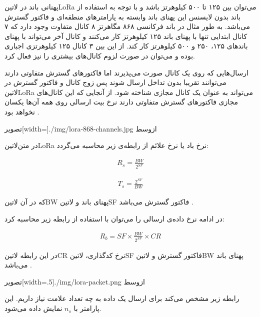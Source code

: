 پهنانی باند در ‌لاتین{LoRa} می‌توان بین ۱۲۵ تا ۵۰۰ کیلوهرتز باشد و با توجه به استفاده از باند بدون لایسنس این پهنای باند وابسته به پارامتر‌های منطقه‌ای و فاکتور گسترش می‌باشد.
به طور مثال در باند فرکانسی ۸۶۸ مگاهرتز ۸ کانال متفاوت وجود دارد که ۷ کانال ابتدایی تنها با پهنای باند ۱۲۵ کیلوهرتز کار می‌کنند و کانال آخر می‌تواند با پهنای باند‌های
۱۲۵، ۲۵۰ و ۵۰۰ کیلوهرتز کار کند. از این بین ۳ کانال ۱۲۵ کیلوهرتزی اجباری بوده و می‌توان در صورت لزوم کانال‌های بیشتری را نیز فعال کرد.

ارسال‌هایی که روی یک کانال صورت می‌پذیرند اما فاکتورهای گسترش متفاوتی دارند می‌توانند تقریبا بدون تداخل ارسال شوند پس زوج کانال و فاکتور گسترش در ‌لاتین{LoRa} می‌تواند به عنوان
یک کانال مجازی شناخته شود. از آنجایی که این کانال‌های مجازی فاکتورهای گسترش متفاوتی دارند نرخ بیت ارسالی روی همه آن‌ها یکسان نخواهد بود
.

‌تصویر[width=\textwidth]{./img/lora-868-channels.jpg}
‌ازوسط

در متن‌لاتین{LoRa} نرخ باد یا نرخ علائم از رابطه‌ی زیر محاسبه می‌گردد:

\begin{align}
  \label{معادله: نرخ باد یا علائم در LoRa}
  R_{s} = \frac{BW}{2^{SF}}
\end{align}

\begin{align}
  \label{معادله: زمان علامت در LoRa}
  T_{s} = \frac{2^{SF}}{BW}
\end{align}

که در آن ‌لاتین{BW} پهنای باند و ‌لاتین{SF} فاکتور گسترش می‌باشد
.

در ادامه نرخ داده‌ی ارسالی را می‌توان با استفاده از رابطه زیر محاسبه کرد:

\begin{align}
  \label{معادله: نرخ داده در LoRa}
  R_{b} = SF \times \frac{BW}{2^{SF}} \times CR
\end{align}

در این رابطه ‌لاتین{CR} نرخ کدگذاری، ‌لاتین{SF} فاکتور گسترش و ‌لاتین{BW} پهنای باند می‌باشد
.

‌تصویر[width=.5\textwidth]{./img/lora-packet.png}
‌ازوسط

رابطه زیر مشخص می‌کند برای ارسال یک داده به چه تعداد علامت نیاز داریم. این پارامتر با $n_{s}$ نمایش داده می‌شود.

